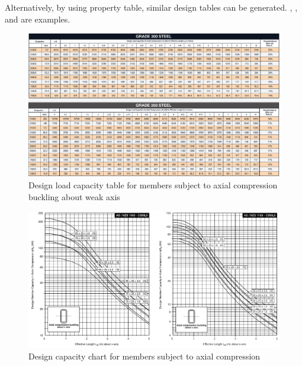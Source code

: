 Alternatively, by using property table, similar design tables can be generated. , ,  and  are examples.
\begin{figure}
\centering
\includegraphics[width=\linewidth]{PIC/CH04/TABLE}
\caption{Design load capacity table for members subject to axial compression buckling about weak axis}\label{fig:design_table}
\end{figure}
\begin{figure}
\centering
\includegraphics[width=\linewidth]{PIC/CH04/CHART}
\caption{Design capacity chart for members subject to axial compression}\label{fig:design_chart}
\end{figure}
